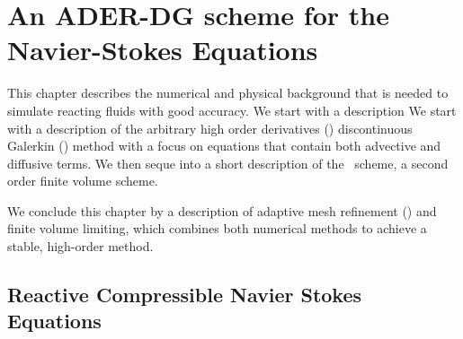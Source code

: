 


\newcommand{\flux}{F}
\newcommand{\viscFlux}{\flux^{v}}
\newcommand{\hyperFlux}{\flux^{h}}
\newcommand{\source}[1][]{
  \notblank{#1}{
S_{#1}
}{
\bm{S}
}
}

\newcommand{\curTime}{t^n}
\newcommand{\nextTime}{t^{n+1}}
\newcommand{\intdt}[1]{\int_{\curTime}^{\nextTime} #1 \dd{t}}
\newcommand{\intdcell}[1]{\int_{\cell} #1 \dd{\bm{x}}}
\newcommand{\intdrefcell}[1]{\int_{\cell} #1 \dd{\hat{\bm{x}}}}
\newcommand{\intdcellb}[1]{\int_{\partial{} \cell} #1 \dd{S}} %
\newcommand{\intdrefcellb}[1]{\int_{\partial{} \cell} #1 \hat{\dd{S}}} %

\newcommand{\quadWeight}[1][i]{w_{#1}}
\newcommand{\quadNode}[1][i]{n_{#1}}
\newcommand{\sbasisSize}{(N+1)^\dimensions}
\newcommand{\stbasisSize}{(N+1)^{\dimensions+1}}

\chapter{An ADER-DG scheme for the Navier-Stokes Equations}\label{chap:methods}
This chapter describes the numerical and physical background that is needed to simulate reacting fluids with good accuracy.
We start with a description 
We start with a description of the arbitrary high order derivatives (\ader) discontinuous Galerkin (\dg) method with a focus on equations that contain both advective and diffusive terms.
We then seque into a short description of the \muscl\ scheme, a second order finite volume scheme.

We conclude this chapter by a description of adaptive mesh refinement (\amr) and finite volume limiting, which combines both numerical methods to achieve a stable, high-order method.

\section{Reactive Compressible Navier Stokes Equations}\label{sec:navier-stokes}
\newcommand{\diffCoeff}{\varepsilon}
\newcommand{\hyperFluxDef}{
  \begin{pmatrix}
    \Qj \\
    \Qv  \otimes \Qj + \bm{I} \pressure  \\
    \Qv \cdot (\bm{I} \QE + \bm{I} \pressure) \\
    \Qj \QZZ
  \end{pmatrix}
}

